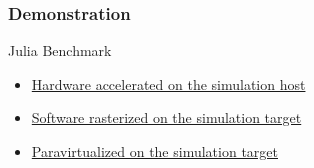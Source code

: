 
\begin{frame}	

\frametitle{Demonstration}

Julia Benchmark
\begin{itemize}
	\item \href{http://youtube.com/embed/GKs6OlWKFV8?rel=0&vq=hd1080&autoplay=1}{Hardware accelerated on the simulation host}
	\item \href{http://youtube.com/embed/3sCyzppFL0w?rel=0&vq=hd1080&autoplay=1}{Software rasterized on the simulation target}
	\item \href{http://youtube.com/embed/__d_EeZBzwc?rel=0&vq=hd1080&autoplay=1}{Paravirtualized on the simulation target}
\end{itemize}


\end{frame}